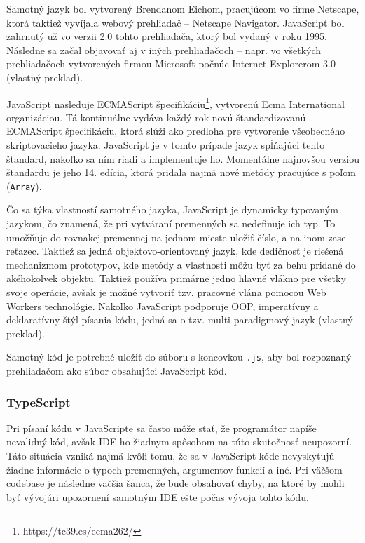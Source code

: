 Samotný jazyk bol vytvorený Brendanom Eichom, pracujúcom vo firme Netscape, ktorá taktiež vyvíjala webový prehliadač -- Netscape Navigator. \newline JavaScript bol zahrnutý už vo verzii 2.0 tohto prehliadača, ktorý bol vydaný v roku 1995. Následne sa začal objavovať aj v iných prehliadačoch -- napr. vo všetkých prehliadačoch vytvorených firmou Microsoft počnúc Internet Explorerom 3.0 \cite{ecmascript_specification} (vlastný preklad). 

JavaScript nasleduje ECMAScript špecifikáciu\footnote{https://tc39.es/ecma262/}, vytvorenú Ecma International organizáciou. Tá kontinuálne vydáva každý rok novú štandardizovanú ECMAScript špecifikáciu, ktorá slúži ako predloha pre vytvorenie všeobecného skriptovacieho jazyka. JavaScript je v tomto prípade jazyk spĺňajúci tento štandard, nakoľko sa ním riadi a implementuje ho. Momentálne najnovšou verziou štandardu je jeho 14. edícia, ktorá pridala najmä nové metódy pracujúce s poľom (\texttt{Array}).

Čo sa týka vlastností samotného jazyka, JavaScript je dynamicky typovaným jazykom, čo znamená, že pri vytváraní premenných sa nedefinuje ich typ. To umožňuje do rovnakej premennej na jednom mieste uložiť číslo, a na inom zase reťazec. Taktiež sa jedná objektovo-orientovaný jazyk, kde dedičnosť je riešená mechanizmom prototypov, kde metódy a vlastnosti môžu byť za behu pridané do akéhokoľvek objektu. Taktiež používa primárne jedno hlavné vlákno pre všetky svoje operácie, avšak je možné vytvoriť tzv. pracovné vlána pomocou Web Workers technológie. Nakoľko JavaScript podporuje OOP, imperatívny a deklaratívny štýl písania kódu, jedná sa o tzv. multi-paradigmový jazyk \cite{ecmascript_specification} (vlastný preklad).

Samotný kód je potrebné uložiť do súboru s koncovkou \texttt{.js}, aby bol rozpoznaný prehliadačom ako súbor obsahujúci JavaScript kód.

\subsubsection {TypeScript}
Pri písaní kódu v JavaScripte sa často môže stať, že programátor napíše nevalidný kód, avšak IDE ho žiadnym spôsobom na túto skutočnosť neupozorní. Táto situácia vzniká najmä kvôli tomu, že sa v JavaScript kóde nevyskytujú žiadne informácie o typoch premenných, argumentov funkcií a iné. Pri väčšom codebase je následne väčšia šanca, že bude obsahovať chyby, na ktoré by mohli byť vývojári upozornení samotným IDE ešte počas vývoja tohto kódu.

